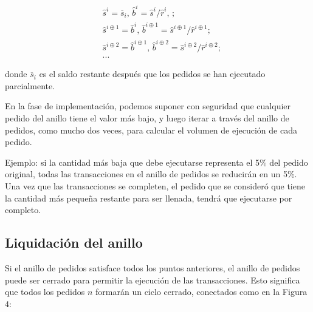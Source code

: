 \documentclass[UTF8,nofonts]{article}
\makeatletter
\newenvironment{figurehere}
 {\def\@captype{figure}}
 {}
\makeatother
\begin{document}
\begin{multicols}{2}
\[
\begin{split}
&\hat{s}^{i}=\overline{s}_i\text{, } \hat{b}^{i}=\hat{s}^{i}/ \hat{r}^i\text{, }\text{;}\\
&\hat{s}^{i\oplus 1}=\hat{b}^i\text{, } \hat{b}^{i\oplus 1}=\hat{s}^{i\oplus 1}/ \hat{r}^{i\oplus 1}\text{;}\\
&\hat{s}^{i\oplus 2}=\hat{b}^{i\oplus 1}\text{, } \hat{b}^{i\oplus 2}=\hat{s}^{i\oplus 2}/ \hat{r}^{i\oplus 2}\text{;}\\
& ...
\end{split}
\]

donde $\overline{s}_i$ es el saldo restante despu\'es que los pedidos se han ejecutado parcialmente.

En la fase de implementaci\'on, podemos suponer con seguridad que cualquier pedido del anillo tiene el valor m\'as bajo, y luego iterar a trav\'es del anillo de pedidos, como mucho dos veces, para calcular el volumen de ejecuci\'on de cada pedido.


Ejemplo: si la cantidad m\'as baja que debe ejecutarse representa el 5\% del pedido original, todas las transacciones en el anillo de pedidos se reducir\'an en un 5\%. Una vez que las transacciones se completen, el pedido que se consider\'o que tiene la cantidad m\'as peque\~na restante para ser llenada, tendr\'a que ejecutarse por completo.


\subsection{Liquidaci\'on del anillo\label{sec:settlement}}
Si el anillo de pedidos satisface todos los puntos anteriores, el anillo de pedidos puede ser cerrado para permitir la ejecuci\'on de las transacciones. Esto significa que todos los pedidos $n$ formar\'an un ciclo cerrado, conectados como en la Figura 4:


\begin{center}
\begin{figurehere}
\centering
{}
\end{figurehere}
\end{center}
\end{multicols}
\end{document}
